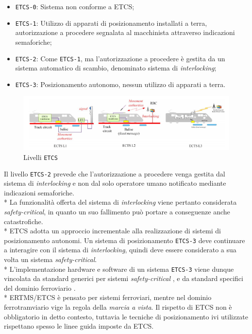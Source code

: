 \begin{itemize}
	\item \texttt{ETCS-0}: Sistema non conforme a ETCS;
	\item \texttt{ETCS-1}: Utilizzo di apparati di posizionamento installati a terra, autorizzazione a procedere segnalata al macchinista attraverso indicazioni semaforiche;
	\item \texttt{ETCS-2}: Come \texttt{ETCS-1}, ma l'autorizzazione a procedere \`e gestita da un sistema automatico di scambio, denominato sistema di \emph{interlocking};\cite{interlocking}
	\item \texttt{ETCS-3}: Posizionamento autonomo, nessun utilizzo di apparati a terra.
\end{itemize}
\begin{figure}[h]
	\centering
	\includegraphics[width=\linewidth]{img/etcs123.png}
	\caption{Livelli \texttt{ETCS}}
	\label{fig:etcs123}
\end{figure}
Il livello \texttt{ETCS-2} prevede che l'autorizzazione a procedere venga gestita dal sistema di \emph{interlocking} e non dal solo operatore umano notificato mediante indicazioni semaforiche.\\*
La funzionalit\`a offerta del sistema di \emph{interlocking} viene pertanto considerata \emph{safety-critical}, in quanto un suo fallimento pu\`o portare a conseguenze anche catastrofiche.\cite{marocchini}\\*
ETCS adotta un approccio incrementale alla realizzazione di sistemi di posizionamento autonomi. Un sistema di posizionamento \texttt{ETCS-3} deve continuare a interagire con il sistema di \emph{interlocking}, quindi deve essere considerato a sua volta un sistema \emph{safety-critical}.\\*
L'implementazione hardware e software di un sistema \texttt{ETCS-3} viene dunque vincolata da standard generici per sistemi \emph{safety-critical} \cite{MISRA} \cite{sil}, e da standard specifici del dominio ferroviario \cite{50128}.\\*
ERTMS/ETCS \`e pensato per sistemi ferroviari, mentre nel dominio ferrotramviario vige la regola della \emph{marcia a vista}. Il rispetto di ETCS non \`e obbligatorio in detto contesto, tuttavia le tecniche di posizionamento ivi utilizzate rispettano spesso le linee guida imposte da ETCS. 

